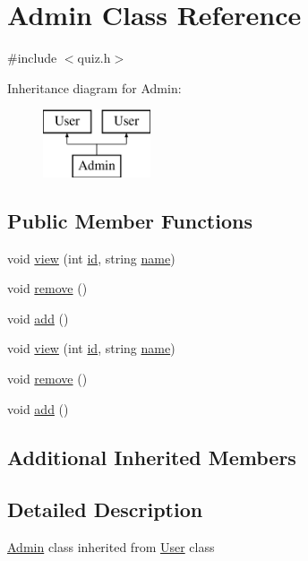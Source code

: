 \hypertarget{class_admin}{}\section{Admin Class Reference}
\label{class_admin}


{\ttfamily \#include $<$quiz.\+h$>$}

Inheritance diagram for Admin\+:\begin{figure}[H]
\begin{center}
\leavevmode
\includegraphics[height=2.000000cm]{class_admin}
\end{center}
\end{figure}
\subsection*{Public Member Functions}
\begin{DoxyCompactItemize}
\item 
void \hyperlink{class_admin_a3064fddba449b5699678dae6218fc3b8}{view} (int \hyperlink{class_user_aa7e6e39b43020bbe9c3a196b3689b0f7}{id}, string \hyperlink{class_user_a643f85779a4693855c171c396f49e515}{name})
\item 
void \hyperlink{class_admin_a7ff3c33183ba1b6dee66c5e8b1aac386}{remove} ()
\item 
void \hyperlink{class_admin_a7d8d62a090555b8ee72e3a3c78f32036}{add} ()
\item 
void \hyperlink{class_admin_a3064fddba449b5699678dae6218fc3b8}{view} (int \hyperlink{class_user_aa7e6e39b43020bbe9c3a196b3689b0f7}{id}, string \hyperlink{class_user_a643f85779a4693855c171c396f49e515}{name})
\item 
void \hyperlink{class_admin_a7ff3c33183ba1b6dee66c5e8b1aac386}{remove} ()
\item 
void \hyperlink{class_admin_a7d8d62a090555b8ee72e3a3c78f32036}{add} ()
\end{DoxyCompactItemize}
\subsection*{Additional Inherited Members}


\subsection{Detailed Description}
\hyperlink{class_admin}{Admin} class inherited from \hyperlink{class_user}{User} class 

